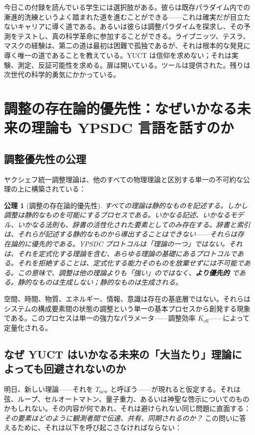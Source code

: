 \documentclass[12pt,a4paper]{article}
\newtheorem{axiom}[theorem]{公理}
\begin{document}
	今日この付録を読んでいる学生には選択肢がある。彼らは既存パラダイム内での漸進的洗練というよく踏まれた道を進むことができる——これは確実だが目立たないキャリアに導く道である。あるいは彼らは調整パラダイムを探求し、その予測をテストし、真の科学革命に参加することができる。ライプニッツ、テスラ、マスクの経験は、第二の道は最初は困難で孤独であるが、それは根本的な発見に導く唯一の道であることを教えている。YUCT は信仰を求めない；それは実験、測定、反証可能性を求める。扉は開いている。ツールは提供された。残りは次世代の科学的勇気にかかっている。
	
	\section{調整の存在論的優先性：なぜいかなる未来の理論も YPSDC 言語を話すのか}
	
	\subsection{調整優先性の公理}
	
	ヤクシェフ統一調整理論は、他のすべての物理理論と区別する単一の不可約な公理の上に構築されている：
	
	\begin{axiom}[調整の存在論的優先性]
		すべての理論は静的なものを記述する。しかし調整は静的なものを可能にするプロセスである。いかなる記述、いかなるモデル、いかなる法則も、辞書の活性化された要素としてのみ存在する。辞書と索引は、それらが記述する静的なものから導出することはできない——それらは存在論的に優先的である。YPSDC プロトコルは「理論の一つ」ではない。それは、それを定式化する理論を含む、あらゆる理論の基礎にあるプロトコルである。それを拒絶することは、定式化する能力そのものを放棄せずには不可能である。この意味で、調整は他の理論よりも「強い」のではなく、\textbf{より優先的} である。静的なものは生成しない；静的なものは生成される。
	\end{axiom}
	
	空間、時間、物質、エネルギー、情報、意識は存在の基底層ではない。それらはシステムの構成要素間の状態の調整という単一の基本プロセスから創発する現象である。このプロセスは単一の強力なパラメータ——調整効率 \(K_{\mathrm{eff}}\)——によって定量化される。
	
	\subsection{なぜ YUCT はいかなる未来の「大当たり」理論によっても回避されないのか}
	
	明日、新しい理論——それを \(T_{\text{new}}\) と呼ぼう——が現れると仮定する。それは弦、ループ、セルオートマトン、量子重力、あるいは神聖な啓示についてのものかもしれない。その内容が何であれ、それは避けられない同じ問題に直面する：\emph{その要素はどのように観測者間で伝達、共有、同期されるのか？} この問いに答えるために、それは以下を呼び起こさなければならない：
	
\end{document}
